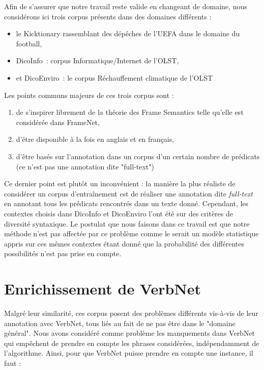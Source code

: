 Afin de s'assurer que notre travail reste valide en changeant de domaine, nous
considérons ici trois corpus présents dans des domaines différents :

\begin{itemize}
    \item le Kicktionary rassemblant des dépêches de l'UEFA dans le domaine du football,
    \item DicoInfo~: corpus Informatique/Internet de l'OLST,
    \item et DicoEnviro~: le corpus Réchauffement climatique de l'OLST
\end{itemize}

Les points communs majeurs de ces trois corpus sont :
\begin{enumerate}
    \item de s'inspirer librement de la théorie des Frame Semantics telle qu'elle est considérée dans FrameNet,
    \item d'être disponible à la fois en anglais et en français,
    \item d'être basés sur l'annotation dans un corpus d'un certain nombre de prédicats (ce n'est pas une annotation dite "full-text")
\end{enumerate}

Ce dernier point est plutôt un inconvénient : la manière la plus réaliste de
considérer un corpus d'entraînement est de réaliser une annotation dite
\textit{full-text} en annotant tous les prédicats rencontrés dans un texte
donné. Cependant, les contextes choisis dans DicoInfo et DicoEnviro l'ont été
sur des critères de diversité syntaxique. \citep{lhomme2012adding} Le postulat
que nous faisons dans ce travail est que notre méthode n'est pas affectée par
ce problème comme le serait un modèle statistique appris sur ces mêmes
contextes étant donné que la probabilité des différentes possibilités n'est pas
prise en compte.

\section{Enrichissement de VerbNet}

Malgré leur similarité, ces corpus posent des problèmes différents vis-à-vis de
leur annotation avec VerbNet, tous liés au fait de ne pas être dans le "domaine
général". Nous avons considéré comme problème les manquements dans VerbNet qui
empêchent de prendre en compte les phrases considérées, indépendamment de
l'algorithme. Ainsi, pour que VerbNet puisse prendre en compte une instance, il
faut :


